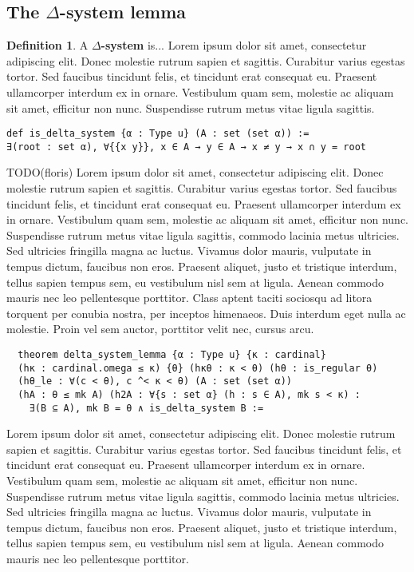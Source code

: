 \documentclass[a4paper,USenglish,cleveref, autoref]{lipics-v2019}
\theoremstyle{definition}
\newtheorem{defn}[theorem]{Definition}
\begin{document}
\subsection{The $\Delta$-system lemma}

\begin{defn}
  A \textbf{$\Delta$-system} is... Lorem ipsum dolor sit amet, consectetur adipiscing elit. Donec molestie rutrum sapien et sagittis. Curabitur varius egestas tortor. Sed faucibus tincidunt felis, et tincidunt erat consequat eu. Praesent ullamcorper interdum ex in ornare. Vestibulum quam sem, molestie ac aliquam sit amet, efficitur non nunc. Suspendisse rutrum metus vitae ligula sagittis.
\end{defn}
\begin{lstlisting}
def is_delta_system {α : Type u} (A : set (set α)) :=
∃(root : set α), ∀{{x y}}, x ∈ A → y ∈ A → x ≠ y → x ∩ y = root
\end{lstlisting}

TODO(floris)
Lorem ipsum dolor sit amet, consectetur adipiscing elit. Donec molestie rutrum sapien et sagittis. Curabitur varius egestas tortor. Sed faucibus tincidunt felis, et tincidunt erat consequat eu. Praesent ullamcorper interdum ex in ornare. Vestibulum quam sem, molestie ac aliquam sit amet, efficitur non nunc. Suspendisse rutrum metus vitae ligula sagittis, commodo lacinia metus ultricies. Sed ultricies fringilla magna ac luctus. Vivamus dolor mauris, vulputate in tempus dictum, faucibus non eros. Praesent aliquet, justo et tristique interdum, tellus sapien tempus sem, eu vestibulum nisl sem at ligula. Aenean commodo mauris nec leo pellentesque porttitor. Class aptent taciti sociosqu ad litora torquent per conubia nostra, per inceptos himenaeos. Duis interdum eget nulla ac molestie. Proin vel sem auctor, porttitor velit nec, cursus arcu.

\begin{lstlisting}
  theorem delta_system_lemma {α : Type u} {κ : cardinal}
  (hκ : cardinal.omega ≤ κ) {θ} (hκθ : κ < θ) (hθ : is_regular θ)
  (hθ_le : ∀(c < θ), c ^< κ < θ) (A : set (set α))
  (hA : θ ≤ mk A) (h2A : ∀{s : set α} (h : s ∈ A), mk s < κ) :
    ∃(B ⊆ A), mk B = θ ∧ is_delta_system B :=
  \end{lstlisting}

  Lorem ipsum dolor sit amet, consectetur adipiscing elit. Donec molestie rutrum sapien et sagittis. Curabitur varius egestas tortor. Sed faucibus tincidunt felis, et tincidunt erat consequat eu. Praesent ullamcorper interdum ex in ornare. Vestibulum quam sem, molestie ac aliquam sit amet, efficitur non nunc. Suspendisse rutrum metus vitae ligula sagittis, commodo lacinia metus ultricies. Sed ultricies fringilla magna ac luctus. Vivamus dolor mauris, vulputate in tempus dictum, faucibus non eros. Praesent aliquet, justo et tristique interdum, tellus sapien tempus sem, eu vestibulum nisl sem at ligula. Aenean commodo mauris nec leo pellentesque porttitor.
\end{document}
